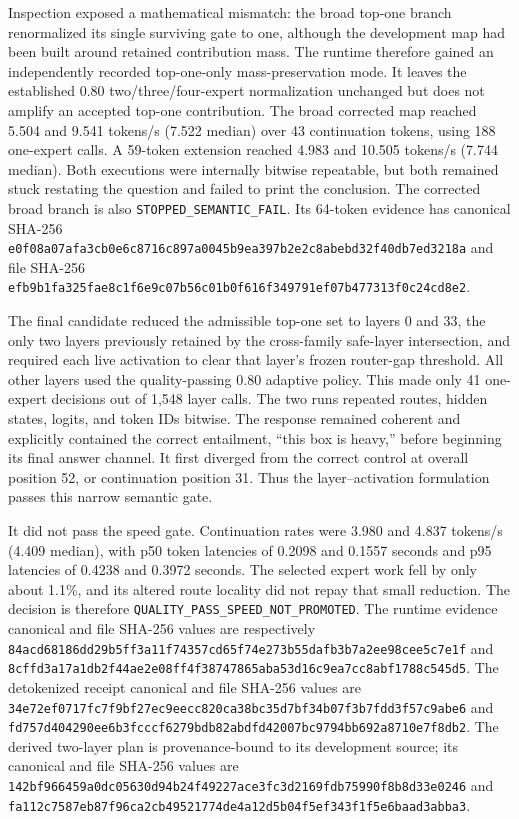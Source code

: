 Inspection exposed a mathematical mismatch: the broad top-one branch
renormalized its single surviving gate to one, although the development map
had been built around retained contribution mass.  The runtime therefore
gained an independently recorded top-one-only mass-preservation mode.  It
leaves the established 0.80 two/three/four-expert normalization unchanged but
does not amplify an accepted top-one contribution.  The broad corrected map
reached 5.504 and 9.541 tokens/s (7.522 median) over 43 continuation tokens,
using 188 one-expert calls.  A 59-token extension reached 4.983 and 10.505
tokens/s (7.744 median).  Both executions were internally bitwise repeatable,
but both remained stuck restating the question and failed to print the
conclusion.  The corrected broad branch is also
\texttt{STOPPED\_SEMANTIC\_FAIL}.  Its 64-token evidence has canonical
SHA-256
\texttt{e0f08a07afa3cb0e6c8716c897a0045b9ea397b2e2c8abebd32f40db7ed3218a}
and file SHA-256
\texttt{efb9b1fa325fae8c1f6e9c07b56c01b0f616f349791ef07b477313f0c24cd8e2}.

The final candidate reduced the admissible top-one set to layers 0 and 33,
the only two layers previously retained by the cross-family safe-layer
intersection, and required each live activation to clear that layer's frozen
router-gap threshold.  All other layers used the quality-passing 0.80
adaptive policy.  This made only 41 one-expert decisions out of 1,548 layer
calls.  The two runs repeated routes, hidden states, logits, and token IDs
bitwise.  The response remained coherent and explicitly contained the correct
entailment, ``this box is heavy,'' before beginning its final answer channel.
It first diverged from the correct control at overall position 52, or
continuation position 31.  Thus the layer--activation formulation passes this
narrow semantic gate.

It did not pass the speed gate.  Continuation rates were 3.980 and 4.837
tokens/s (4.409 median), with p50 token latencies of 0.2098 and 0.1557 seconds
and p95 latencies of 0.4238 and 0.3972 seconds.  The selected expert work fell
by only about 1.1\%, and its altered route locality did not repay that small
reduction.  The decision is therefore
\texttt{QUALITY\_PASS\_SPEED\_NOT\_PROMOTED}.  The runtime evidence canonical
and file SHA-256 values are respectively
\texttt{84acd68186dd29b5ff3a11f74357cd65f74e273b55dafb3b7a2ee98cee5c7e1f}
and
\texttt{8cffd3a17a1db2f44ae2e08ff4f38747865aba53d16c9ea7cc8abf1788c545d5}.
The detokenized receipt canonical and file SHA-256 values are
\texttt{34e72ef0717fc7f9bf27ec9eecc820ca38bc35d7bf34b07f3b7fdd3f57c9abe6}
and
\texttt{fd757d404290ee6b3fcccf6279bdb82abdfd42007bc9794bb692a8710e7f8db2}.
The derived two-layer plan is provenance-bound to its development source; its
canonical and file SHA-256 values are
\texttt{142bf966459a0dc05630d94b24f49227ace3fc3d2169fdb75990f8b8d33e0246}
and
\texttt{fa112c7587eb87f96ca2cb49521774de4a12d5b04f5ef343f1f5e6baad3abba3}.

